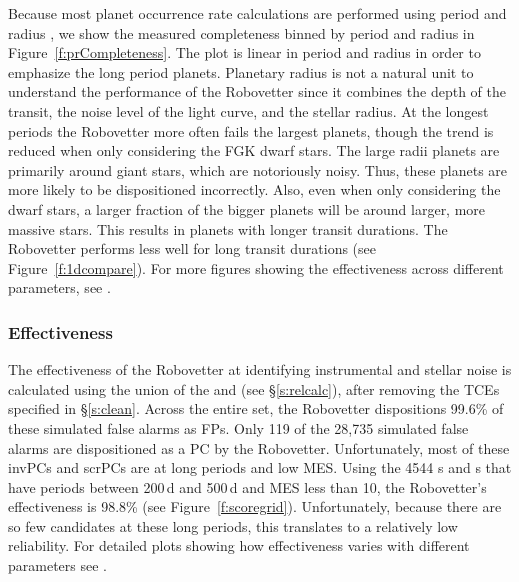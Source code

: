 Because most planet occurrence rate calculations are performed using period and radius \citep[e.g.,][]{Burke2015}, we show the measured completeness binned by period and radius in Figure~\ref{f:prCompleteness}. The plot is linear in period and radius in order to emphasize the long period planets. Planetary radius is not a natural unit to understand the performance of the Robovetter since it combines the depth of the transit, the noise level of the light curve, and the stellar radius.  At the longest periods the Robovetter more often fails the largest planets, though the trend is reduced when only considering the FGK dwarf stars. The large radii planets are primarily around giant stars, which are notoriously noisy. Thus, these planets are more likely to be dispositioned incorrectly. Also, even when only considering the dwarf stars, a larger fraction of the bigger planets will be around larger, more massive stars. This results in planets with longer transit durations. The Robovetter performs less well for long transit durations (see Figure~\ref{f:1dcompare}). For more figures showing the effectiveness across different parameters, see \citet{Coughlin2017a}.


\subsubsection{Effectiveness}
The effectiveness of the Robovetter at identifying instrumental and stellar noise is calculated using the union of the  and  (see \S\ref{s:relcalc}), after removing the TCEs specified in \S\ref{s:clean}. Across the entire set, the Robovetter dispositions 99.6\% of these simulated false alarms as FPs.  Only 119 of the 28,735 simulated false alarms are dispositioned as a PC by the Robovetter.  Unfortunately, most of these invPCs and scrPCs are at long periods and low MES. Using the 4544 \invtce s and \scrtce s that have periods between 200\,d and 500\,d and MES less than 10, the Robovetter's effectiveness is 98.8\% (see Figure~\ref{f:scoregrid}).  Unfortunately, because there are so few candidates at these long periods, this translates to a relatively low reliability.  For detailed plots showing how effectiveness varies with different parameters see \citet{Coughlin2017a}.


